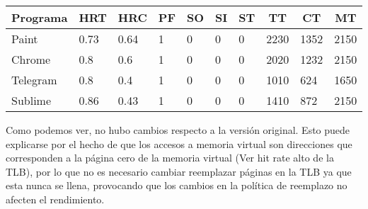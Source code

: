 \documentclass{article}
\begin{document}
\begin{table}[H]
\begin{tabular}{|l|l|l|l|l|l|l|l|l|l|}
\hline
\multicolumn{1}{|c|}{\textbf{Programa}} & \multicolumn{1}{c|}{\textbf{HRT}} & \multicolumn{1}{c|}{\textbf{HRC}} & \multicolumn{1}{c|}{\textbf{PF}} & \multicolumn{1}{c|}{\textbf{SO}} & \multicolumn{1}{c|}{\textbf{SI}} & \multicolumn{1}{c|}{\textbf{ST}} & \multicolumn{1}{c|}{\textbf{TT}} & \multicolumn{1}{c|}{\textbf{CT}} & \multicolumn{1}{c|}{\textbf{MT}} \\ \hline
Paint                                   & 0.73                              & 0.64                              & 1                                & 0                                & 0                                & 0                                & 2230                             & 1352                             & 2150                             \\ \hline
Chrome                                  & 0.8                               & 0.6                               & 1                                & 0                                & 0                                & 0                                & 2020                             & 1232                             & 2150                             \\ \hline
Telegram                                & 0.8                               & 0.4                               & 1                                & 0                                & 0                                & 0                                & 1010                             & 624                              & 1650                             \\ \hline
Sublime                                 & 0.86                              & 0.43                              & 1                                & 0                                & 0                                & 0                                & 1410                             & 872                              & 2150                             \\ \hline
\end{tabular}
\end{table}


Como podemos ver, no hubo cambios respecto a la versión original. Esto puede explicarse por el hecho de que los accesos a memoria virtual son direcciones que corresponden a la página cero de la memoria virtual (Ver hit rate alto de la TLB), por lo que no es necesario cambiar reemplazar páginas en la TLB ya que esta nunca se llena, provocando que los cambios en la política de reemplazo no afecten el rendimiento.
\end{document}
